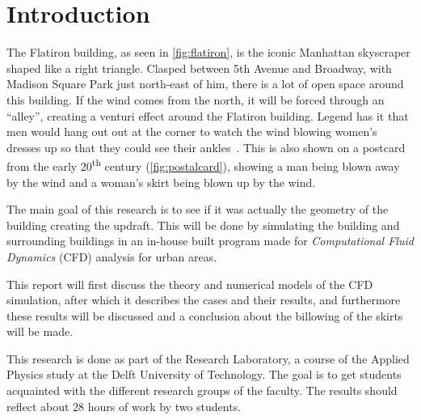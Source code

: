 \section{Introduction}
\label{intro}
The Flatiron building, as seen in \autoref{fig:flatiron}, is the iconic Manhattan skyscraper shaped like a right triangle. Clasped between 5th Avenue and Broadway, with Madison Square Park just north-east of him, there is a lot of open space around this building. If the wind comes from the north, it will be forced through an ``alley'', creating a venturi effect around the Flatiron building. Legend has it that men would hang out out at the corner to watch the wind blowing women's dresses up so that they could see their ankles~\cite{dresses}. This is also shown on a postcard from the early 20\textsuperscript{th} century (\autoref{fig:postalcard}), showing a man being blown away by the wind and a woman's skirt being blown up by the wind.  

The main goal of this research is to see if it was actually the geometry of the building creating the updraft. This will be done by simulating the building and surrounding buildings in an in-house built program made for \emph{Computational Fluid Dynamics} (CFD) analysis for urban areas.

This report will first discuss the theory and numerical models of the CFD simulation, after which it describes the cases and their results, and furthermore these results will be discussed and a conclusion about the billowing of the skirts will be made.

This research is done as part of the Research Laboratory, a course of the Applied Physics study at the Delft University of Technology. The goal is to get students acquainted with the different research groups of the faculty. The results should reflect about 28 hours of work by two students. 

